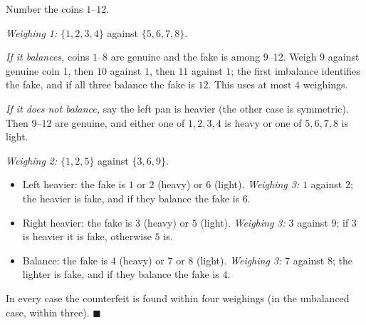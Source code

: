 Number the coins $1$--$12$.

\emph{Weighing 1:} $\{1,2,3,4\}$ against $\{5,6,7,8\}$.

\emph{If it balances,} coins $1$--$8$ are genuine and the fake is among $9$--$12$. Weigh $9$ against genuine coin $1$, then $10$ against $1$, then $11$ against $1$; the first imbalance identifies the fake, and if all three balance the fake is $12$. This uses at most $4$ weighings.

\emph{If it does not balance,} say the left pan is heavier (the other case is symmetric). Then $9$--$12$ are genuine, and either one of $1,2,3,4$ is heavy or one of $5,6,7,8$ is light.

\emph{Weighing 2:} $\{1,2,5\}$ against $\{3,6,9\}$.
\begin{itemize}
\item Left heavier: the fake is $1$ or $2$ (heavy) or $6$ (light). \emph{Weighing 3:} $1$ against $2$; the heavier is fake, and if they balance the fake is $6$.
\item Right heavier: the fake is $3$ (heavy) or $5$ (light). \emph{Weighing 3:} $3$ against $9$; if $3$ is heavier it is fake, otherwise $5$ is.
\item Balance: the fake is $4$ (heavy) or $7$ or $8$ (light). \emph{Weighing 3:} $7$ against $8$; the lighter is fake, and if they balance the fake is $4$.
\end{itemize}
In every case the counterfeit is found within four weighings (in the unbalanced case, within three). $\blacksquare$
